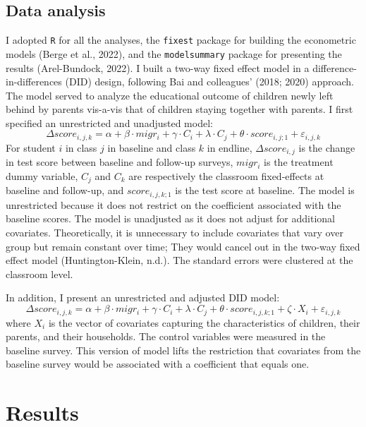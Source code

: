 \documentclass[
  man,floatsintext]{apa7}
\begin{document}
\hypertarget{data-analysis}{%
\subsection{Data analysis}\label{data-analysis}}

I adopted \texttt{R} for all the analyses, the \texttt{fixest} package for building the econometric models (Berge et al., 2022), and the \texttt{modelsummary} package for presenting the results (Arel-Bundock, 2022). I built a two-way fixed effect model in a difference-in-differences (DID) design, following Bai and colleagues' (2018; 2020) approach. The model served to analyze the educational outcome of children newly left behind by parents vis-a-vis that of children staying together with parents. I first specified an unrestricted and unadjusted model: \[\Delta score_{i,j,k} = \alpha + \beta \cdot migr_{i} + \gamma \cdot C_{i} + \lambda \cdot C_{j} + \theta \cdot score_{i,j;1} + \varepsilon_{i,j,k}\] For student \(i\) in class \(j\) in baseline and class \(k\) in endline, \(\Delta score_{i,j}\) is the change in test score between baseline and follow-up surveys, \(migr_{i}\) is the treatment dummy variable, \(C_{j}\) and \(C_{k}\) are respectively the classroom fixed-effects at baseline and follow-up, and \(score_{i,j,k;1}\) is the test score at baseline. The model is unrestricted because it does not restrict on the coefficient associated with the baseline scores. The model is unadjusted as it does not adjust for additional covariates. Theoretically, it is unnecessary to include covariates that vary over group but remain constant over time; They would cancel out in the two-way fixed effect model (Huntington-Klein, n.d.). The standard errors were clustered at the classroom level.

In addition, I present an unrestricted and adjusted DID model: \[\Delta score_{i,j,k} = \alpha + \beta \cdot migr_{i} + \gamma \cdot C_{i} + \lambda \cdot C_{j} + \theta \cdot score_{i,j,k;1} + \zeta \cdot X_{i} + \varepsilon_{i,j,k}\] where \(X_{i}\) is the vector of covariates capturing the characteristics of children, their parents, and their households. The control variables were measured in the baseline survey. This version of model lifts the restriction that covariates from the baseline survey would be associated with a coefficient that equals one.

\newpage

\hypertarget{results}{%
\section{Results}\label{results}}
\end{document}
